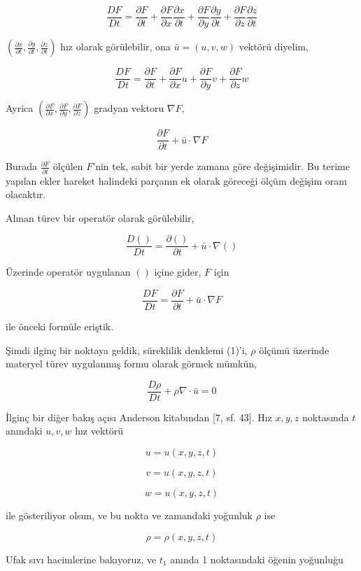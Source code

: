 \documentclass[12pt,fleqn]{article}\usepackage{../../common}
\begin{document}
$$
\frac{D F}{D t} =
\frac{\partial F}{\partial t} +
\frac{\partial F}{\partial x} \frac{\partial x}{\partial t} + 
\frac{\partial F}{\partial y} \frac{\partial y}{\partial t} + 
\frac{\partial F}{\partial z} \frac{\partial z}{\partial t} 
$$

$(\frac{\partial x}{\partial t}, \frac{\partial y}{\partial t},\frac{\partial
z}{\partial t})$ hız olarak görülebilir, ona $\bar{u} = (u,v,w)$ vektörü diyelim,

$$
\frac{D F}{D t} =
\frac{\partial F}{\partial t} +
\frac{\partial F}{\partial x} u + 
\frac{\partial F}{\partial y} v + 
\frac{\partial F}{\partial z} w 
$$

Ayrica $(\frac{\partial F}{\partial x},\frac{\partial F}{\partial y},\frac{\partial F}{\partial z})$
gradyan vektoru $\nabla F$,

$$
\frac{\partial F}{\partial t} + \bar{u} \cdot \nabla F
$$

Burada $\frac{\partial F}{\partial t}$ ölçülen $F$'nin tek, sabit bir yerde
zamana göre değişimidir. Bu terime yapılan ekler hareket halindeki parçanın ek
olarak göreceği ölçüm değişim oranı olacaktır.

Alınan türev bir operatör olarak görülebilir, 

$$
\frac{D ()}{D t} = \frac{\partial () }{\partial t} + \bar{u} \cdot \nabla ()
$$

Üzerinde operatör uygulanan $()$ içine gider, $F$ için

$$
\frac{D F}{D t} = \frac{\partial F}{\partial t} + \bar{u} \cdot \nabla F
$$

ile önceki formüle eriştik.

Şimdi ilginç bir noktaya geldik, süreklilik denklemi (1)'i, $\rho$ ölçümü
üzerinde materyel türev uygulanmış formu olarak görmek mümkün,

$$
\frac{D \rho}{D t} + \rho \nabla \cdot \bar{u} = 0
$$

İlginç bir diğer bakış açısı Anderson kitabından [7, sf. 43]. Hız $x,y,z$
noktasında $t$ anındaki $u,v,w$ hız vektörü

$$
u = u(x,y,z,t)
$$

$$
v = u(x,y,z,t)
$$

$$
w = u(x,y,z,t)
$$

ile gösteriliyor olsun, ve bu nokta ve zamandaki yoğunluk $\rho$ ise

$$
\rho = \rho(x,y,z,t)
$$


Ufak sıvı hacimlerine bakıyoruz, ve $t_1$ anında 1 noktasındaki öğenin
yoğunluğu
\end{document}
